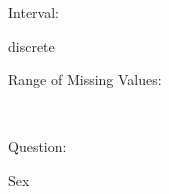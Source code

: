 \documentclass[
]{article}
\begin{document}
\begin{minipage}[t]{0.3\linewidth}

Interval:

\end{minipage}%
\begin{minipage}[t]{0.7\linewidth}

discrete

\end{minipage}

\begin{minipage}[t]{0.3\linewidth}

Range of Missing Values:

\end{minipage}%
\begin{minipage}[t]{0.7\linewidth}

~

\end{minipage}

\begin{minipage}[t]{0.3\linewidth}

Question:

\end{minipage}%
\begin{minipage}[t]{0.7\linewidth}

Sex

\end{minipage}
\end{document}
